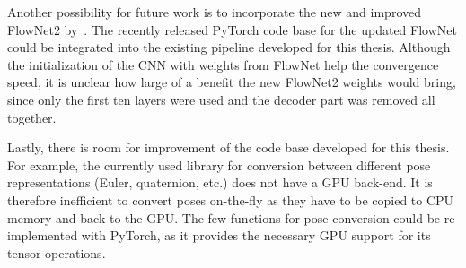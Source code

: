 Another possibility for future work is to incorporate the new and improved FlowNet2 by~\cite{ilg2016flownet}.
The recently released PyTorch code base for the updated FlowNet could be integrated into the existing pipeline developed for this thesis.
Although the initialization of the CNN with weights from FlowNet help the convergence speed, it is unclear how large of a benefit the new FlowNet2 weights would bring, since only the first ten layers were used and the decoder part was removed all together. 

Lastly, there is room for improvement of the code base developed for this thesis.
For example, the currently used library for conversion between different pose representations (Euler, quaternion, etc.) does not have a GPU back-end.
It is therefore inefficient to convert poses on-the-fly as they have to be copied to CPU memory and back to the GPU.
The few functions for pose conversion could be re-implemented with PyTorch, as it provides the necessary GPU support for its tensor operations.
